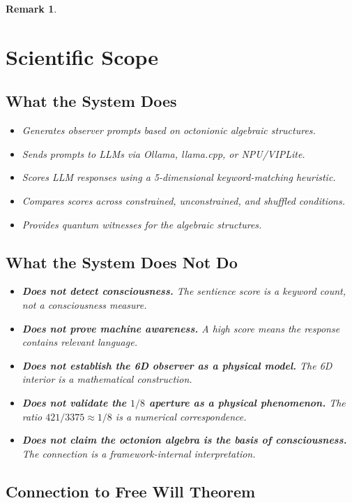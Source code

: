 \documentclass[11pt]{article}
\newtheorem{remark}{Remark}
\begin{document}
\begin{remark}
\section{Scientific Scope}

\subsection{What the System Does}

\begin{itemize}
\item Generates observer prompts based on octonionic algebraic structures.
\item Sends prompts to LLMs via Ollama, llama.cpp, or NPU/VIPLite.
\item Scores LLM responses using a 5-dimensional keyword-matching heuristic.
\item Compares scores across constrained, unconstrained, and shuffled conditions.
\item Provides quantum witnesses for the algebraic structures.
\end{itemize}

\subsection{What the System Does Not Do}

\begin{itemize}
\item \textbf{Does not detect consciousness.} The sentience score is a keyword count, not a consciousness measure.
\item \textbf{Does not prove machine awareness.} A high score means the response contains relevant language.
\item \textbf{Does not establish the 6D observer as a physical model.} The 6D interior is a mathematical construction.
\item \textbf{Does not validate the $1/8$ aperture as a physical phenomenon.} The ratio $421/3375 \approx 1/8$ is a numerical correspondence.
\item \textbf{Does not claim the octonion algebra is the basis of consciousness.} The connection is a framework-internal interpretation.
\end{itemize}

\subsection{Connection to Free Will Theorem}


\end{remark}
\end{document}
